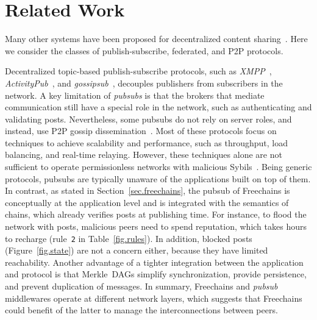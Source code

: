 \documentclass[12pt]{article}
\newcommand{\FC}       {Freechains\xspace}
\newcommand{\code}[1]  {\texttt{\footnotesize{#1}}}
\begin{document}
\section{Related Work}
\label{sec.related}

Many other systems have been proposed for decentralized content
sharing~\cite{p2p.survey,p2p.ecosystem}.
Here we consider the classes of publish-subscribe, federated, and P2P
protocols.


Decentralized topic-based publish-subscribe protocols, such as
    \emph{XMPP}~\cite{pubsub.xmpp},
    \emph{ActivityPub}~\cite{pubsub.activitypub}, and
    \emph{gossipsub}~\cite{pubsub.gossipsub},
decouples publishers from subscribers in the network.
%
A key limitation of \emph{pubsubs} is that the brokers that mediate
communication still have a special role in the network, such as authenticating
and validating posts.
%
Nevertheless, some pubsubs do not rely on server roles, and instead, use
P2P gossip dissemination~\cite{pubsub.tera,pubsub.rappel,pubsub.gossipsub}.
Most of these protocols focus on techniques to achieve scalability and
performance, such as throughput, load balancing, and real-time relaying.
%
However, these techniques alone are not sufficient to operate permissionless
networks with malicious Sybils~\cite{pubsub.gossipsub2}.
Being generic protocols, pubsubs are typically unaware of the applications
built on top of them.
%
In contrast, as stated in Section~\ref{sec.freechains}, the pubsub of \FC is
conceptually at the application level and is integrated with the semantics of
chains, which already verifies posts at publishing time.
For instance, to flood the network with posts, malicious peers need to spend
reputation, which takes hours to recharge (rule~\code{2} in
Table~\ref{fig.rules}).
In addition, blocked posts (Figure~\ref{fig.state}) are not a concern either,
because they have limited reachability.
Another advantage of a tighter integration between the application and protocol
is that Merkle~DAGs simplify synchronization, provide persistence, and prevent
duplication of messages.
%
In summary, \FC and \emph{pubsub} middlewares operate at different network
layers, which suggests that \FC could benefit of the latter to manage the
interconnections between peers.

\end{document}
